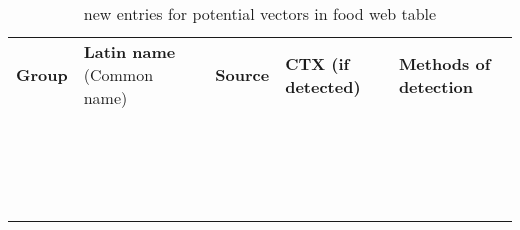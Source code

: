 \documentclass[12pt]{article}
\begin{document}

\begin{table}
\caption{new entries for potential vectors in food web table}
\begin{tabular}{ p{2cm} p{3cm}  p{4.5cm}  p{2cm}  p{3cm}  }
\textbf{Group} & \textbf{Latin name} (Common name) & \textbf{Source} & \textbf{CTX (if detected)} & \textbf{Methods of detection} \\
  &  \emph{} &  &  & \\
  & \emph{}  &  &  & \\
  & \emph{} &  &  & \\
  &  \emph{} &  &  & \\
  & \emph{}  &  &  & \\
  & \emph{} &  &  & \\
  &  \emph{} &  &  & \\
  & \emph{}  &  &  & \\
  & \emph{} &  &  & \\
  &  \emph{} &  &  & \\
  & \emph{}  &  &  & \\
  & \emph{} &  &  & \\
  &  \emph{} &  &  & \\
  & \emph{}  &  &  & \\
  & \emph{} &  &  & \\
  &  \emph{} &  &  & \\
  & \emph{}  &  &  & \\
  & \emph{} &  &  & \\
\end{tabular}
\end{table}
\end{document}
